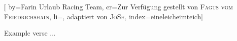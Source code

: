 
[%
    by={Farin Urlaub Racing Team},
    cr={Zur Verf\"{u}gung gestellt von \textsc{Fagus vom Friedrichshain}},
    li={, adaptiert von \textsc{JoSh}},
    index={eineleicheimteich}]


    \label{eineleicheimteich}

    \beginverse
        Example verse ...
    \endverse
\endsong
